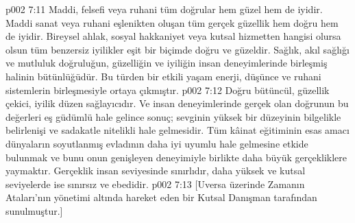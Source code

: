 \vs p002 7:11 Maddi, felsefi veya ruhani tüm doğrular hem güzel hem de iyidir. Maddi sanat veya ruhani eşlenikten oluşan tüm gerçek güzellik hem doğru hem de iyidir. Bireysel ahlak, sosyal hakkaniyet veya kutsal hizmetten hangisi olursa olsun tüm benzersiz iyilikler eşit bir biçimde doğru ve güzeldir. Sağlık, akıl sağlığı ve mutluluk doğruluğun, güzelliğin ve iyiliğin insan deneyimlerinde birleşmiş halinin bütünlüğüdür. Bu türden bir etkili yaşam enerji, düşünce ve ruhani sistemlerin birleşmesiyle ortaya çıkmıştır.
\vs p002 7:12 Doğru bütüncül, güzellik çekici, iyilik düzen sağlayıcıdır. Ve insan deneyimlerinde gerçek olan doğrunun bu değerleri eş güdümlü hale gelince sonuç; sevginin yüksek bir düzeyinin bilgelikle belirlenişi ve sadakatle nitelikli hale gelmesidir. Tüm kâinat eğitiminin esas amacı dünyaların soyutlanmış evladının daha iyi uyumlu hale gelmesine etkide bulunmak ve bunu onun genişleyen deneyimiyle birlikte daha büyük gerçekliklere yaymaktır. Gerçeklik insan seviyesinde sınırlıdır, daha yüksek ve kutsal seviyelerde ise sınırsız ve ebedidir.
\vs p002 7:13 [Uversa üzerinde Zamanın Ataları’nın yönetimi altında hareket eden bir Kutsal Danışman tarafından sunulmuştur.]
